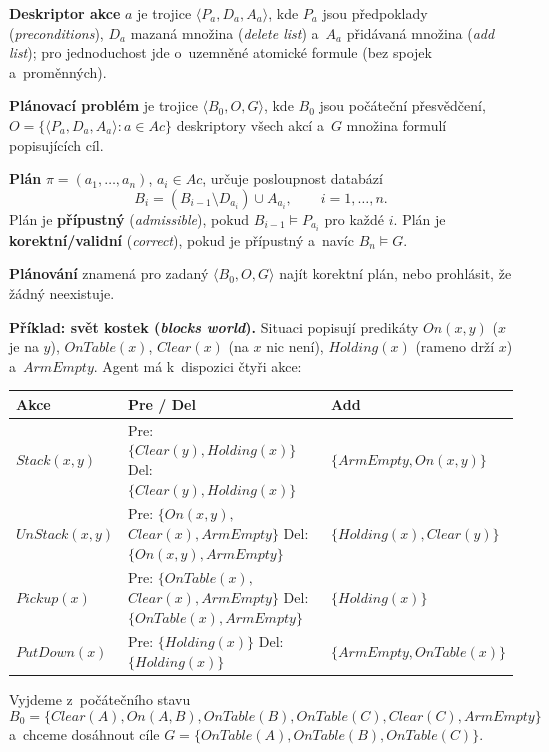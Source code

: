 \documentclass[11pt,a4paper]{article}
\theoremstyle{definition}
\begin{document}
\begin{defbox}
\textbf{Deskriptor akce} $a$ je trojice $\langle P_a, D_a, A_a\rangle$, kde
$P_a$ jsou předpoklady (\emph{preconditions}), $D_a$ mazaná množina (\emph{delete list})
a~$A_a$ přidávaná množina (\emph{add list}); pro jednoduchost jde o~uzemněné atomické formule
(bez spojek a~proměnných).

\textbf{Plánovací problém} je trojice $\langle B_0, O, G\rangle$, kde $B_0$ jsou počáteční
přesvědčení, $O = \{\langle P_a,D_a,A_a\rangle : a \in \mathit{Ac}\}$ deskriptory všech akcí
a~$G$ množina formulí popisujících cíl.

\textbf{Plán} $\pi = (a_1,\dots,a_n)$, $a_i \in \mathit{Ac}$, určuje posloupnost databází
\[
B_i = (B_{i-1} \setminus D_{a_i}) \cup A_{a_i}, \qquad i = 1,\dots,n .
\]
Plán je \textbf{přípustný} (\emph{admissible}), pokud $B_{i-1} \models P_{a_i}$ pro každé $i$.
Plán je \textbf{korektní/validní} (\emph{correct}), pokud je přípustný a~navíc $B_n \models G$.

\textbf{Plánování} znamená pro zadaný $\langle B_0,O,G\rangle$ najít korektní plán, nebo prohlásit,
že žádný neexistuje.
\end{defbox}

\medskip
\noindent\textbf{Příklad: svět kostek (\emph{blocks world}).}
Situaci popisují predikáty $\mathit{On}(x,y)$ ($x$ je na $y$), $\mathit{OnTable}(x)$,
$\mathit{Clear}(x)$ (na $x$ nic není), $\mathit{Holding}(x)$ (rameno drží $x$)
a~$\mathit{ArmEmpty}$. Agent má k~dispozici čtyři akce:
\begin{center}
\small
\begin{tabular}{p{} p{} p{}}
\toprule
\textbf{Akce} & \textbf{Pre / Del} & \textbf{Add} \\
\midrule
$\mathit{Stack}(x,y)$
  & Pre: $\{\mathit{Clear}(y), \mathit{Holding}(x)\}$ \newline
    Del: $\{\mathit{Clear}(y), \mathit{Holding}(x)\}$
  & $\{\mathit{ArmEmpty}, \mathit{On}(x,y)\}$ \\
$\mathit{UnStack}(x,y)$
  & Pre: $\{\mathit{On}(x,y),$ $\mathit{Clear}(x),\mathit{ArmEmpty}\}$ \newline
    Del: $\{\mathit{On}(x,y),\mathit{ArmEmpty}\}$
  & $\{\mathit{Holding}(x), \mathit{Clear}(y)\}$ \\
$\mathit{Pickup}(x)$
  & Pre: $\{\mathit{OnTable}(x),$ $\mathit{Clear}(x),\mathit{ArmEmpty}\}$ \newline
    Del: $\{\mathit{OnTable}(x),\mathit{ArmEmpty}\}$
  & $\{\mathit{Holding}(x)\}$ \\
$\mathit{PutDown}(x)$
  & Pre: $\{\mathit{Holding}(x)\}$ \newline
    Del: $\{\mathit{Holding}(x)\}$
  & $\{\mathit{ArmEmpty}, \mathit{OnTable}(x)\}$ \\
\bottomrule
\end{tabular}
\end{center}
Vyjdeme z~počátečního stavu
\[
B_0 = \{\mathit{Clear}(A), \mathit{On}(A,B), \mathit{OnTable}(B),
\mathit{OnTable}(C), \mathit{Clear}(C), \mathit{ArmEmpty}\}
\]
a~chceme dosáhnout cíle $G = \{\mathit{OnTable}(A), \mathit{OnTable}(B), \mathit{OnTable}(C)\}$.
\end{document}

